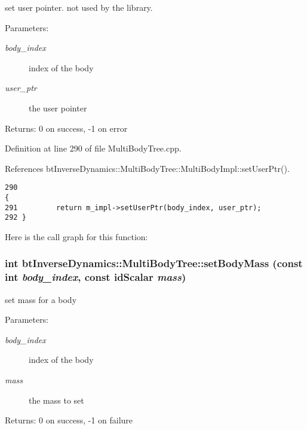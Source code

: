 set user pointer. not used by the library. \begin{Desc}
\item[Parameters:]
\begin{description}
\item[{\em body\_\-index}]index of the body \item[{\em user\_\-ptr}]the user pointer \end{description}
\end{Desc}
\begin{Desc}
\item[Returns:]0 on success, -1 on error \end{Desc}


Definition at line 290 of file MultiBodyTree.cpp.

References btInverseDynamics::MultiBodyTree::MultiBodyImpl::setUserPtr().

\begin{Code}\begin{verbatim}290                                                                         {
291         return m_impl->setUserPtr(body_index, user_ptr);
292 }
\end{verbatim}
\end{Code}




Here is the call graph for this function:\hypertarget{classbt_inverse_dynamics_1_1_multi_body_tree_aec1f7c8093f74529f49e7b36bc59ed7}{
\subsubsection[setBodyMass]{\setlength{\rightskip}{0pt plus 5cm}int btInverseDynamics::MultiBodyTree::setBodyMass (const int {\em body\_\-index}, \/  const idScalar {\em mass})}}
\label{classbt_inverse_dynamics_1_1_multi_body_tree_aec1f7c8093f74529f49e7b36bc59ed7}


set mass for a body \begin{Desc}
\item[Parameters:]
\begin{description}
\item[{\em body\_\-index}]index of the body \item[{\em mass}]the mass to set \end{description}
\end{Desc}
\begin{Desc}
\item[Returns:]0 on success, -1 on failure \end{Desc}


